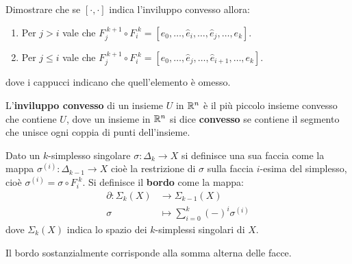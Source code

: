 
\begin{exercise}
  Dimostrare che se $ [\cdot, \cdot] $ indica l'inviluppo convesso allora:
  \begin{enumerate}
  \item Per $ j > i $ vale che $ F_j^{\; k+1} \circ F_i^{\; k} = [e_0, \dots, \hat{e}_i, \dots, \hat{e}_j, \dots, e_k ] $.
  \item Per $ j \leq i $ vale che $ F_j^{\; k+1} \circ F_i^{\; k} = [e_0, \dots, \hat{e}_j, \dots, \hat{e}_{i+1}, \dots, e_k ] $.
  \end{enumerate}
  dove i cappucci indicano che quell'elemento è omesso.
\end{exercise}

\begin{definition}
  L'\textbf{inviluppo convesso} di un insieme $ U $ in
  $ \mathbb{R}^{n} $ è il più piccolo insieme convesso che contiene $ U $, dove un
  insieme in $ \mathbb{R}^{n} $ si dice \textbf{convesso} se
  contiene il segmento che unisce ogni coppia di punti dell'insieme.
\end{definition}

\begin{definition}
  Dato un $ k $-simplesso singolare $ \sigma: \Delta_k \to X $ si definisce una sua faccia
  come la mappa $ \sigma^{(i)} \colon \Delta_{k-1} \to X $ cioè la restrizione di
  $ \sigma $ sulla faccia $ i $-esima del simplesso, cioè
  $ \sigma^{(i)} = \sigma \circ F_i^{\; k} $. Si definisce il \textbf{bordo} come
  la mappa:
  \begin{align*}
    \partial \colon \Sigma_k(X) & \to \Sigma_{k-1}(X) \\
    \sigma & \mapsto  \sum_{i=0}^{k}(-)^i \sigma^{(i)}
  \end{align*}
  dove $ \Sigma_k(X) $ indica lo spazio dei $ k $-simplessi singolari di $ X $.
\end{definition}
Il bordo sostanzialmente corrisponde alla somma alterna delle facce.

